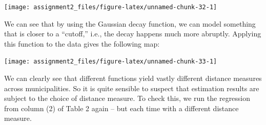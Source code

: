 \documentclass[
  a4paper,
]{article}
\begin{document}
\begin{center}\texttt{[image: assignment2\_files/figure-latex/unnamed-chunk-32-1]} \end{center}

We can see that by using the Gaussian decay function, we can model
something that is closer to a ``cutoff,'' i.e., the decay happens much
more abruptly. Applying this function to the data gives the following
map:

\begin{center}\texttt{[image: assignment2\_files/figure-latex/unnamed-chunk-33-1]} \end{center}

We can clearly see that different functions yield vastly different
distance measures across municipalities. So it is quite sensible to
suspect that estimation results are subject to the choice of distance
measure. To check this, we run the regression from column (2) of Table 2
again -- but each time with a different distance measure.
\end{document}
